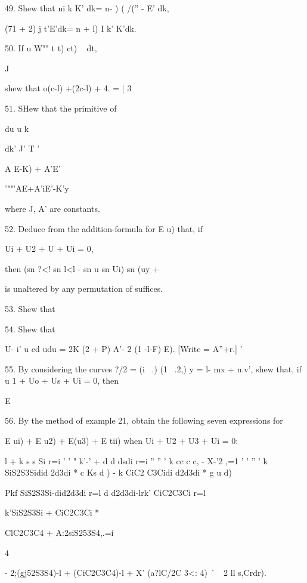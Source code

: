 49. Shew that ni k K' dk= n- ) ( /('' - E' dk,

(71 + 2) j t'E'dk= n + l) I k' K'dk. 

50. If u W"" t t) ct) ~ dt,

  J

shew that o(c-l) +(2c-l) + 4. = | 3

51. SHew that the primitive of

du u k \

dk' J' T '

A E-K) + A'E'


'""'AE+A'iE'-K'y

where J, A' are constants. 

52. Deduce from the addition-formula for E u) that, if

Ui + U2 + U + Ui = 0,

then (sn ?<! sn l<l - sn u sn Ui) sn (uy + %

is unaltered by any permutation of suffices. 

53. Shew that


54. Shew that

U- i' u cd udu = 2K (2 + P) A'- 2 (1 -l-F) E). [Write = A''+r.] '

55. By considering the curves ?/2 = (i \ .) (1 \ .2,) y = l- mx +
n.v', shew that, if u 1 + Uo + Us + Ui = 0, then

E %


56. By the method of example 21, obtain the following seven
expressions for

E ui) + E u2) + E(u3) + E tii) when Ui + U2 + U3 + Ui = 0:

l + k s s Si r=i ' ' " k'-' + d d dsdi r=i '' '' ' k cc c c, - X-'2
,=1 ' ' '' ' k SiS2S3Sidid 2d3di * c Ks d ) - k CiC2 C3Cidi d2d3di * g
u d)

Pkf SiS2S3Si-did2d3di r=l d d2d3di-lrk' CiC2C3Ci r=l

k'SiS2S3Si + CiC2C3Ci *

ClC2C3C4 + A:2siS253S4,.=i

4

- 2;(gj52S3S4)-l + (CiC2C3C4)-l + X' (a?lC/2C 3<: 4)~' ~ 2 ll s,Crdr).

